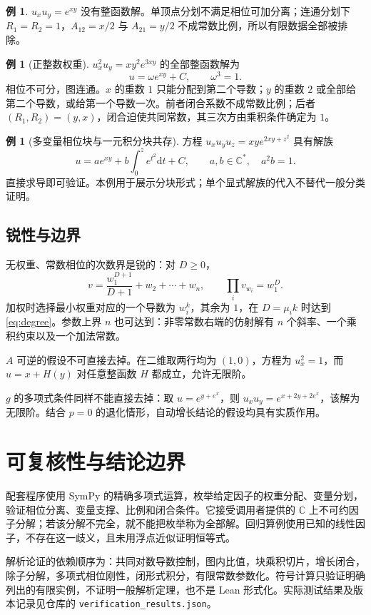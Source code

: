 \documentclass[UTF8,11pt,a4paper,fontset=fandol]{ctexart}
\theoremstyle{definition}\newtheorem{definition}[theorem]{定义}
\newtheorem{example}[theorem]{例}
\theoremstyle{remark}\newtheorem{remark}[theorem]{注}
\newcommand{\C}{\mathbb C}\newcommand{\N}{\mathbb N}
\newcommand{\dd}{\mathrm d}\newcommand{\OO}{\mathcal O}
\begin{document}
\begin{example}
$u_xu_y=e^{xy}$ 没有整函数解。单顶点分划不满足相位可加分离；连通分划下 $R_1=R_2=1$，$A_{12}=x/2$ 与 $A_{21}=y/2$ 不成常数比例，所以有限数据全部被排除。
\end{example}

\begin{example}[正整数权重]
$u_x^2u_y=xy^2e^{3xy}$ 的全部整函数解为
\[
u=\omega e^{xy}+C,\qquad\omega^3=1.
\]
相位不可分，图连通。$x$ 的重数 $1$ 只能分配到第二个导数；$y$ 的重数 $2$ 或全部给第二个导数，或给第一个导数一次。前者闭合系数不成常数比例；后者 $(R_1,R_2)=(y,x)$，闭合迫使共同常数，其三次方由乘积条件确定为 $1$。
\end{example}

\begin{example}[多变量相位块与一元积分块共存]
方程 $u_xu_yu_z=xy e^{2xy+z^2}$ 具有解族
\[
u=a e^{xy}+b\int_0^z e^{t^2}\dd t+C,\qquad a,b\in\C^*,\quad a^2b=1.
\]
直接求导即可验证。本例用于展示分块形式；单个显式解族的代入不替代一般分类证明。
\end{example}

\subsection{锐性与边界}
无权重、常数相位的次数界是锐的：对 $D\ge0$，
\[
v=\frac{w_1^{D+1}}{D+1}+w_2+\cdots+w_n,
\qquad \prod_i v_{w_i}=w_1^D.
\]
加权时选择最小权重对应的一个导数为 $w_i^k$，其余为 $1$，在 $D=\mu_i k$ 时达到\eqref{eq:degree}。参数上界 $n$ 也可达到：非零常数右端的仿射解有 $n$ 个斜率、一个乘积约束以及一个加法常数。

$A$ 可逆的假设不可直接去掉。在二维取两行均为 $(1,0)$，方程为 $u_x^2=1$，而 $u=x+H(y)$ 对任意整函数 $H$ 都成立，允许无限阶。

$g$ 的多项式条件同样不能直接去掉：取 $u=e^{y+e^x}$，则 $u_xu_y=e^{x+2y+2e^x}$，该解为无限阶。结合 $p=0$ 的退化情形，自动增长结论的假设均具有实质作用。

\section{可复核性与结论边界}
配套程序使用 SymPy 的精确多项式运算，枚举给定因子的权重分配、变量分划，验证相位分离、变量支撑、比例和闭合条件。它接受调用者提供的 $\C$ 上不可约因子分解；若该分解不完全，就不能把枚举称为全部解。回归算例使用已知的线性因子，不存在这一歧义，且未用浮点近似证明恒等式。

解析论证的依赖顺序为：共同对数导数控制，图内比值，块乘积切片，增长闭合，除子分解，多项式相位刚性，闭形式积分，有限常数参数化。符号计算只验证明确列出的有限实例，不证明一般解析定理，也不是 Lean 形式化。实际测试结果及版本记录见仓库的 \texttt{verification\_results.json}。
\end{document}
